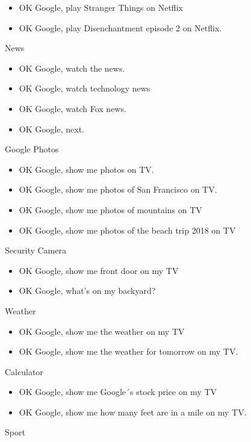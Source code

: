 \documentclass[
  a4paper,
]{article}
\begin{document}
\begin{itemize}
\item
  OK Google, play Stranger Things on Netflix
\item
  OK Google, play Disenchantment episode 2 on Netflix.
\end{itemize}

News

\begin{itemize}
\item
  OK Google, watch the news.
\item
  OK Google, watch technology news
\item
  OK Google, watch Fox news.
\item
  OK Google, next.
\end{itemize}

Google Photos

\begin{itemize}
\item
  OK Google, show me photos on TV.
\item
  OK Google, show me photos of San Francisco on TV.
\item
  OK Google, show me photos of mountains on TV
\item
  OK Google, show me photos of the beach trip 2018 on TV
\end{itemize}

Security Camera

\begin{itemize}
\item
  OK Google, show me front door on my TV
\item
  OK Google, what's on my backyard?
\end{itemize}

Weather

\begin{itemize}
\item
  OK Google, show me the weather on my TV
\item
  OK Google, show me the weather for tomorrow on my TV.
\end{itemize}

Calculator

\begin{itemize}
\item
  OK Google, show me Google´s stock price on my TV
\item
  OK Google, show me how many feet are in a mile on my TV.
\end{itemize}

Sport
\end{document}
